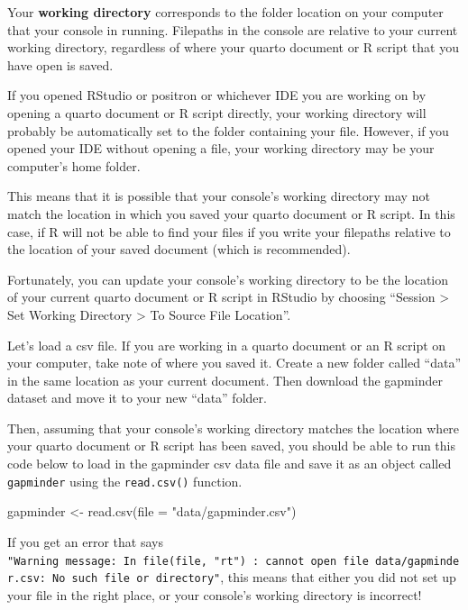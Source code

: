 \documentclass[
  letterpaper,
  DIV=11,
  numbers=noendperiod]{scrreprt}
\newenvironment{Shaded}{\begin{snugshade}}{\end{snugshade}}
\newcommand{\AttributeTok}[1]{\textcolor[rgb]{0.40,0.45,0.13}{#1}}
\newcommand{\FunctionTok}[1]{\textcolor[rgb]{0.28,0.35,0.67}{#1}}
\newcommand{\NormalTok}[1]{\textcolor[rgb]{0.00,0.23,0.31}{#1}}
\newcommand{\OtherTok}[1]{\textcolor[rgb]{0.00,0.23,0.31}{#1}}
\newcommand{\StringTok}[1]{\textcolor[rgb]{0.13,0.47,0.30}{#1}}
\begin{document}
Your \textbf{working directory} corresponds to the folder location on
your computer that your console in running. Filepaths in the console are
relative to your current working directory, regardless of where your
quarto document or R script that you have open is saved.

If you opened RStudio or positron or whichever IDE you are working on by
opening a quarto document or R script directly, your working directory
will probably be automatically set to the folder containing your file.
However, if you opened your IDE without opening a file, your working
directory may be your computer's home folder.

This means that it is possible that your console's working directory may
not match the location in which you saved your quarto document or R
script. In this case, if R will not be able to find your files if you
write your filepaths relative to the location of your saved document
(which is recommended).

Fortunately, you can update your console's working directory to be the
location of your current quarto document or R script in RStudio by
choosing ``Session \textgreater{} Set Working Directory \textgreater{}
To Source File Location''.

Let's load a csv file. If you are working in a quarto document or an R
script on your computer, take note of where you saved it. Create a new
folder called ``data'' in the same location as your current document.
Then download the gapminder dataset and move it to your new ``data''
folder.

Then, assuming that your console's working directory matches the
location where your quarto document or R script has been saved, you
should be able to run this code below to load in the gapminder csv data
file and save it as an object called \texttt{gapminder} using the
\texttt{read.csv()} function.

\begin{Shaded}
\begin{Highlighting}[]
\NormalTok{gapminder }\OtherTok{\textless{}{-}} \FunctionTok{read.csv}\NormalTok{(}\AttributeTok{file =} \StringTok{"data/gapminder.csv"}\NormalTok{)}
\end{Highlighting}
\end{Shaded}

If you get an error that says
\texttt{"Warning\ message:\ In\ file(file,\ "rt")\ :\ cannot\ open\ file\ \textquotesingle{}data/gapminder.csv\textquotesingle{}:\ No\ such\ file\ or\ directory"},
this means that either you did not set up your file in the right place,
or your console's working directory is incorrect!
\end{document}
